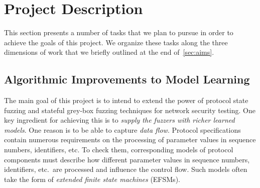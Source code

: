\documentclass[11pt]{article}
\begin{document}
\section{Project Description} \label{sec:description}
This section presents a number of tasks that we plan to pursue in
order to achieve the goals of this project. We organize these tasks along the
three dimensions of work that we briefly outlined at the end of~\cref{sec:aims}.

\subsection{Algorithmic Improvements to Model Learning}
%
The main goal of this project is to intend to extend the power of protocol
state fuzzing and stateful grey-box fuzzing techniques for network security
testing.
One key ingredient for achieving this is to \emph{supply the fuzzers with
richer learned models}. One reason is to be able to
capture \emph{data flow}. Protocol specifications
contain numerous requirements on the processing of parameter values in
sequence numbers, identifiers, etc. To check them, corresponding models of
protocol components must describe how different parameter values in sequence
numbers, identifiers, etc.\ are processed and influence the control flow.
Such models often take the form of \emph{extended finite state machines} (EFSMs).
\end{document}
